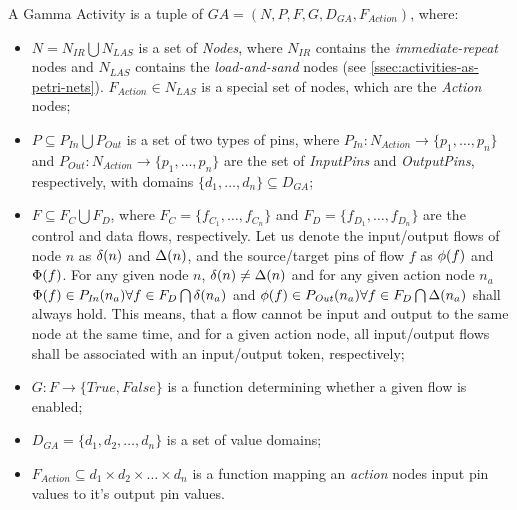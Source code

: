 \begin{definition}
	A Gamma Activity is a tuple of \(\mathit{GA} = (N, P, F, G, D_\mathit{GA}, F_{Action})\), where:
	
	\begin{itemize}
		\item \(N = N_\mathit{IR} \bigcup N_\mathit{LAS} \) is a set of \emph{Nodes}, where \(N_\mathit{IR}\) contains the \emph{immediate-repeat} nodes and \(N_\mathit{LAS}\) contains the \emph{load-and-sand} nodes (see \autoref{ssec:activities-as-petri-nets}). \(F_\mathit{Action} \in N_\mathit{LAS} \) is a special set of nodes, which are the \emph{Action} nodes;
		\item \( P \subseteq P_\mathit{In} \bigcup P_\mathit{Out} \) is a set of two types of pins, where \(P_\mathit{In} : N_\mathit{Action} \rightarrow \{ p_1, \dots, p_n \} \) and \(P_\mathit{Out} : N_\mathit{Action} \rightarrow \{ p_1, \dots, p_n \} \) are the set of \emph{InputPins} and \emph{OutputPins}, respectively, with domains \(\{ d_1, \dots, d_n \} \subseteq D_\mathit{GA} \);
		\item \( F \subseteq F_C \bigcup F_D \), where \(F_C = \{ f_{C_1}, \dots, f_{C_n} \} \) and \(F_D = \{ f_{D_1}, \dots, f_{D_n} \} \) are the control and data flows, respectively. Let us denote the input/output flows of node \(n\) as \( \delta(n) \) and \( \Delta(n) \), and the source/target pins of flow \(f\) as \( \phi(f) \) and \(\Phi(f)\). For any given node \(n\), \( \delta(n) \neq \Delta(n) \) and for any given action node \(n_a\) \( \Phi(f) \in P_\mathit{In}(n_a) \forall f \in F_D \bigcap \delta(n_a) \) and \( \phi(f) \in P_\mathit{Out}(n_a) \forall f \in F_D \bigcap \Delta(n_a) \) shall always hold. This means, that a flow cannot be input and output to the same node at the same time, and for a given action node, all input/output flows shall be associated with an input/output token, respectively;
		\item \(G : F \rightarrow \{ \mathit{True}, \mathit{False} \} \) is a function determining whether a given flow is enabled;
		\item \(D_\mathit{GA} = \{ d_{1}, d_{2}, \dots, d_{n} \} \) is a set of value domains;
		\item \(F_{Action} \subseteq d_{1} \times d_{2} \times \dots \times d_{n} \) is a function mapping an \emph{action} nodes input pin values to it's output pin values.
	\end{itemize}
	

\end{definition}
